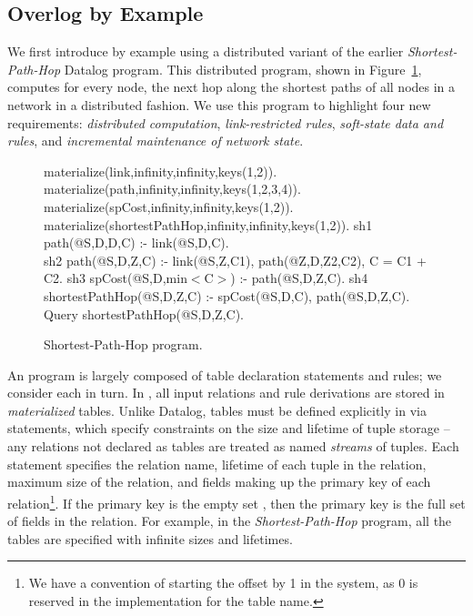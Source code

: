 \subsection{Overlog by Example}
\label{sec:language:firstExample}

We first introduce \Lang by example using a distributed variant of the
earlier {\em Shortest-Path-Hop} Datalog program. This distributed \Lang
program, shown in Figure~\ref{fig:language:dv}, computes for every node,
the next hop along the shortest paths of all nodes in a network in a
distributed fashion. We use this \Lang program to highlight four new
requirements: {\em distributed computation}, {\em link-restricted
  rules}, {\em soft-state data and rules}, and {\em incremental
  maintenance of network state}.


\begin{figure}[t]
\begin{NDlog}
materialize(link,infinity,infinity,keys(1,2)).
materialize(path,infinity,infinity,keys(1,2,3,4)).
materialize(spCost,infinity,infinity,keys(1,2)).
materialize(shortestPathHop,infinity,infinity,keys(1,2)).
sh1 path(@S,D,D,C) :- link(@S,D,C).\\ \noindent
sh2 path(@S,D,Z,C) :- link(@S,Z,C1), path(@Z,D,Z2,C2), C = C1 + C2.
sh3 spCost(@S,D,min$<$C$>$) :- path(@S,D,Z,C).
sh4 shortestPathHop(@S,D,Z,C) :- spCost(@S,D,C), path(@S,D,Z,C).
Query shortestPathHop(@S,D,Z,C).
\end{NDlog}
\caption{{\small Shortest-Path-Hop \Lang program.}}\label{fig:language:dv}
\end{figure}


An \Lang program is largely composed of table declaration statements and
rules; we consider each in turn. In \Lang, all input relations and rule
derivations are stored in {\em materialized} tables. Unlike Datalog,
tables must be defined explicitly in \Lang via 
statements, which specify constraints on the size and lifetime of tuple
storage -- any relations not declared as tables are treated as named
{\em streams} of tuples. Each  statement specifies the relation name, lifetime of each
tuple in the relation, maximum size of the relation, and fields making
up the primary key of each relation\footnote{We have a convention of
starting the offset by 1 in the \Sys system, as 0 is reserved in the
implementation for the table name.}. If the primary key is the empty set
\nd{()}, then the primary key is the full set of fields in the relation.
For example, in the {\em Shortest-Path-Hop} \Lang program, all the
tables are specified with infinite sizes and lifetimes.

